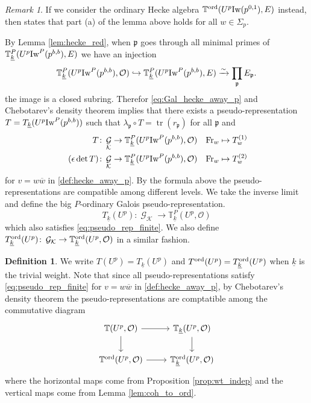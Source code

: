 \documentclass[leqno]{amsart}
\theoremstyle{definition}
\newtheorem{defn}[thm]{Definition}
\theoremstyle{remark}
\newtheorem{rem}[thm]{Remark}
\newcommand{\oo}{\mathcal{O}}
\DeclareMathOperator{\mtr}{tr}
\DeclareMathOperator{\Gal}{\mathcal{G}}
\newcommand{\Fr}{\textnormal{Fr}} %
\newcommand{\fp}{\mathfrak{p}}
\newcommand{\K}{{\mathcal{K}}} %
\newcommand{\bw}{\overline{w}}
\newcommand{\wt}[1]{\underline{ #1 }}
\newcommand{\Iw}{\textnormal{Iw}} %
\newcommand{\TT}{\mathbb{T}} %
\newcommand{\ord}{\textnormal{ord}} %
\begin{document}
\begin{rem}
If we consider the ordinary Hecke algebra
$\TT^{\ord}(U^p\Iw(p^{0,1}),E)$ instead,
then \cite[Cor 2.33]{ger} states that 
part (a) of the lemma above
holds for all $w\in\Sigma_p$.
\end{rem}

By Lemma \ref{lem:hecke_red},
when $\fp$ goes through all minimal primes
of $\TT^P_{\wt{k}}(U^p\Iw^P(p^{b,b}),E)$
we have an injection
\[
	\TT^P_{\wt{k}}(U^p\Iw^P(p^{b,b}),\oo)\hookrightarrow
	\TT^P_{\wt{k}}(U^p\Iw^P(p^{b,b}),E)\xrightarrow{\sim} 
	\prod_{\fp}E_{\fp}.
\]
the image is a closed subring.
Therefor \eqref{eq:Gal_hecke_away_p}
and Chebotarev's density theorem
implies that there exists
a pseudo-representation
$T=T_{\wt{k}}(U^p\Iw^P(p^{b,b}))$ 
such that $\lambda_\fp\circ T=\mtr(r_\fp)$ 
for all $\fp$ and
\begin{equation}\label{eq:pseudo_rep_finite}
\begin{aligned}
	T&\colon \Gal_{\K}
	\to \TT^P_{\wt{k}}(U^p\Iw^P(p^{b,b}),\oo)\quad
	\Fr_w\mapsto T_w^{(1)}\\\
	(\epsilon\det T)&\colon \Gal_{\K}
	\to \TT^P_{\wt{k}}(U^p\Iw^P(p^{b,b}),\oo)\quad
	\Fr_w\mapsto T_w^{(2)}
\end{aligned}
\end{equation}
for $v=w\bw$ in \eqref{def:hecke_away_p}.
By the formula above the pseudo-representations
are compatible among different levels.
We take the inverse limit and define
the big $P$-ordinary Galois pseudo-representation.
\[
T_{\wt{k}}(U^p)\colon \Gal_{\K} \to \TT^P_{\wt{k}}(U^p,\oo)
\]
which also satisfies \eqref{eq:pseudo_rep_finite}.
We also define 
$T_{\wt{k}}^{\ord}(U^p)\colon 
\Gal_{\K} \to \TT^{\ord}_{\wt{k}}(U^p,\oo)$
in a similar fashion.

\begin{defn}\label{def:big_Gal}
We write $T(U^p)=T_{\wt{k}}(U^p)$ and 
$T^{\ord}(U^p)=T_{\wt{k}}^{\ord}(U^p)$
when $\wt{k}$ is the trivial weight.
Note that since all pseudo-representations satisfy
\eqref{eq:pseudo_rep_finite}
for $v=w\bw$ in \eqref{def:hecke_away_p},
by Chebotarev's density theorem 
the pseudo-representations are comptatible among
the commutative diagram
\[
\begin{tikzcd}
    \TT(U^p,\oo) 
    \arrow[r] \arrow[d]&
    \TT_{\wt{k}}(U^p,\oo) 
    \arrow[d]\\
    \TT^{\ord}(U^p,\oo) 
    \arrow[r] &
    \TT^{\ord}_{\wt{k}}(U^p,\oo) 
\end{tikzcd}
\]
where the horizontal maps come from Proposition \ref{prop:wt_indep}
and the vertical maps come from Lemma \ref{lem:coh_to_ord}.
\end{defn}
\end{document}
